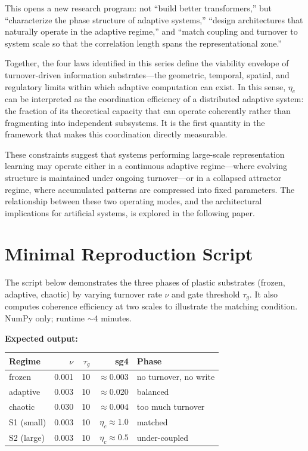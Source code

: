 \documentclass[11pt]{article}
\begin{document}
This opens a new research program: not ``build better transformers,'' but ``characterize the phase structure of adaptive systems,'' ``design architectures that naturally operate in the adaptive regime,'' and ``match coupling and turnover to system scale so that the correlation length spans the representational zone.''

Together, the four laws identified in this series define the viability envelope of turnover-driven information substrates---the geometric, temporal, spatial, and regulatory limits within which adaptive computation can exist.
In this sense, $\eta_c$ can be interpreted as the coordination efficiency of a distributed adaptive system: the fraction of its theoretical capacity that can operate coherently rather than fragmenting into independent subsystems. It is the first quantity in the framework that makes this coordination directly measurable.

These constraints suggest that systems performing large-scale representation learning may operate either in a continuous adaptive regime---where evolving structure is maintained under ongoing turnover---or in a collapsed attractor regime, where accumulated patterns are compressed into fixed parameters. The relationship between these two operating modes, and the architectural implications for artificial systems, is explored in the following paper.

\appendix
\section{Minimal Reproduction Script}

The script below demonstrates the three phases of plastic substrates (frozen, adaptive, chaotic) by varying turnover rate $\nu$ and gate threshold $\tau_g$. It also computes coherence efficiency at two scales to illustrate the matching condition. NumPy only; runtime $\sim$4 minutes.

\textbf{Expected output:}
\begin{center}
\begin{tabular}{lrrrl}
\toprule
\textbf{Regime} & $\nu$ & $\tau_g$ & \textbf{sg4} & \textbf{Phase} \\
\midrule
frozen  & 0.001 & 10 & $\approx$0.003 & no turnover, no write \\
adaptive & 0.003 & 10 & $\approx$0.020 & balanced \\
chaotic  & 0.030 & 10 & $\approx$0.004 & too much turnover \\
\midrule
S1 (small) & 0.003 & 10 & $\eta_c \approx 1.0$ & matched \\
S2 (large) & 0.003 & 10 & $\eta_c \approx 0.5$ & under-coupled \\
\bottomrule
\end{tabular}
\end{center}
\end{document}
